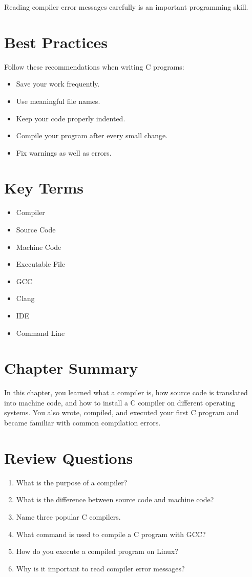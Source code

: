 \documentclass[12pt,openany]{book}
\begin{document}
Reading compiler error messages carefully is an important programming skill.

\section{Best Practices}

Follow these recommendations when writing C programs:

\begin{itemize}
    \item Save your work frequently.
    \item Use meaningful file names.
    \item Keep your code properly indented.
    \item Compile your program after every small change.
    \item Fix warnings as well as errors.
\end{itemize}
\section{Key Terms}

\begin{itemize}
    \item Compiler
    \item Source Code
    \item Machine Code
    \item Executable File
    \item GCC
    \item Clang
    \item IDE
    \item Command Line
\end{itemize}

\section{Chapter Summary}

In this chapter, you learned what a compiler is, how source code is translated into machine code, and how to install a C compiler on different operating systems. You also wrote, compiled, and executed your first C program and became familiar with common compilation errors.

\section{Review Questions}

\begin{enumerate}
    \item What is the purpose of a compiler?
    \item What is the difference between source code and machine code?
    \item Name three popular C compilers.
    \item What command is used to compile a C program with GCC?
    \item How do you execute a compiled program on Linux?
    \item Why is it important to read compiler error messages?
\end{enumerate}
\end{document}

